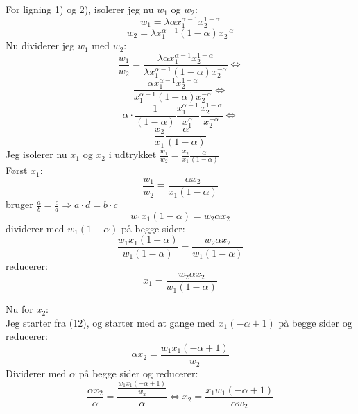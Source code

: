 \documentclass{article}
\begin{document}
For ligning 1) og 2), isolerer jeg nu $w_1$ og $w_2$:
\begin{equation}
    w_1=\lambda \alpha x_1^{\alpha-1} x_2^{1-\alpha}
\end{equation}
\begin{equation}
    w_2=\lambda x_1^{\alpha-1}(1-\alpha) x_2^{-\alpha}
\end{equation}
Nu dividerer jeg $w_1$ med $w_2$:
\begin{equation}
    \frac{w_1}{w_2}=\frac{\lambda \alpha x_1^{\alpha-1} x_2^{1-\alpha}}{\lambda x_1^{\alpha-1}(1-\alpha) x_2^{-\alpha}} \Leftrightarrow
\end{equation}
\begin{equation}
    \frac{\alpha x_1^{\alpha-1} x_2^{1-\alpha}}{x_1^{\alpha-1}(1-\alpha) x_2^{-\alpha}} \Leftrightarrow
\end{equation}
\begin{equation}
    \alpha \cdot \frac{1}{(1-\alpha)} \frac{x_1^{\alpha-1}}{x_1^\alpha} \frac{x_2^{1-\alpha}}{x_2^{-\alpha}} \Leftrightarrow
\end{equation}
\begin{equation}
    \frac{x_2}{x_1} \frac{\alpha}{(1-\alpha)}
\end{equation}
Jeg isolerer nu $x_1$ og $x_2$ i udtrykket $\frac{w_1}{w_2}=\frac{x_2}{x_1} \frac{\alpha}{(1-\alpha)}$
\\Først $x_1$:
\begin{equation}
    \frac{w_1}{w_2}=\frac{\alpha x_2}{x_1(1-\alpha)}
\end{equation}
bruger $\frac{a}{b}=\frac{c}{d} \Rightarrow a \cdot d=b \cdot c$
\begin{equation}
    w_1 x_1(1-\alpha)=w_2 \alpha x_2
\end{equation}
dividerer med $w_1(1-\alpha)$ på begge sider:
\begin{equation}
    \frac{w_1 x_1(1-\alpha)}{w_1(1-\alpha)}=\frac{w_2 \alpha x_2}{w_1(1-\alpha)}
\end{equation}
reducerer:
\begin{equation}
    x_1=\frac{w_2 \alpha x_2}{w_1(1-\alpha)}
\end{equation}

Nu for $x_2$:
\\Jeg starter fra (12), og starter med at gange med $x_1(-\alpha+1)$ på begge sider og reducerer:
\begin{equation}
    \alpha x_2=\frac{w_1 x_1(-\alpha+1)}{w_2}
\end{equation}
Dividerer med $\alpha$ på begge sider og reducerer:
\begin{equation}
    \frac{\alpha x_2}{\alpha}=\frac{\frac{w_1 x_1(-\alpha+1)}{w_2}}{\alpha} \Leftrightarrow x_2=\frac{x_1 w_1(-\alpha+1)}{\alpha w_2}
\end{equation}
\end{document}
